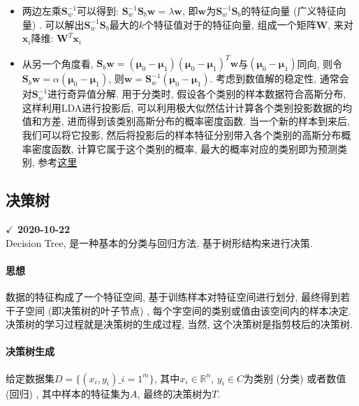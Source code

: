 \begin{itemize}
	\item 两边左乘$\boldsymbol{S}_w^{-1}$可以得到: $\boldsymbol{S}_w^{-1} \mathbf{S}_{b} \boldsymbol{w}=\lambda  \boldsymbol{w}$, 即$\boldsymbol{w}$为$\boldsymbol{S}_w^{-1} \mathbf{S}_{b}$的特征向量 (广义特征向量) . 可以解出$\boldsymbol{S}_w^{-1} \mathbf{S}_{b}$最大的$k$个特征值对于的特征向量, 组成一个矩阵$\boldsymbol{W}$, 来对$\boldsymbol{x}_i$降维: $\boldsymbol{W}^T \boldsymbol{x}_i$
	
	\item 从另一个角度看, $\mathbf{S}_{b} \boldsymbol{w} = (\boldsymbol{\mu}_0 - \boldsymbol{\mu}_1) (\boldsymbol{\mu}_0 - \boldsymbol{\mu}_1)^T \boldsymbol{w}$与$(\boldsymbol{\mu}_0 - \boldsymbol{\mu}_1)$同向, 则令$\mathbf{S}_{b} \boldsymbol{w} = \alpha (\boldsymbol{\mu}_0 - \boldsymbol{\mu}_1)$, 则$\boldsymbol{w} = \boldsymbol{S}_w^{-1} (\boldsymbol{\mu}_0 - \boldsymbol{\mu}_1)$. 考虑到数值解的稳定性, 通常会对$\boldsymbol{S}_w^{-1}$进行奇异值分解. 用于分类时, 假设各个类别的样本数据符合高斯分布, 这样利用LDA进行投影后, 可以利用极大似然估计计算各个类别投影数据的均值和方差, 进而得到该类别高斯分布的概率密度函数. 当一个新的样本到来后, 我们可以将它投影, 然后将投影后的样本特征分别带入各个类别的高斯分布概率密度函数, 计算它属于这个类别的概率, 最大的概率对应的类别即为预测类别, 参考\href{https://www.cnblogs.com/pinard/p/6244265.html}{这里}
\end{itemize}


\subsection{决策树}
\textbf{$\checkmark$ 2020-10-22}\\
Decision Tree, 是一种基本的分类与回归方法, 基于树形结构来进行决策. 
\paragraph{思想}数据的特征构成了一个特征空间, 基于训练样本对特征空间进行划分, 最终得到若干子空间 (即决策树的叶子节点) , 每个字空间的类别或值由该空间内的样本决定. 决策树的学习过程就是决策树的生成过程, 当然, 这个决策树是指剪枝后的决策树. 

\paragraph{决策树生成}给定数据集$D = \{(x_i, y_i)\_{i=1}^{m}\}$, 其中$x_i \in \mathbb{R}^n$, $y_i \in C$为类别 (分类) 或者数值 (回归) , 其中样本的特征集为$A$, 最终的决策树为$T$. 

